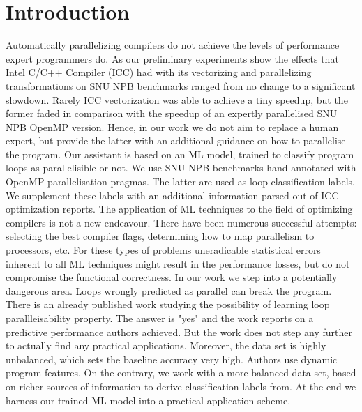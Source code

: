 \documentclass{acaces}
\begin{document}
\section{Introduction}
\quad Automatically parallelizing compilers do not achieve the levels of performance expert programmers do. As our preliminary experiments show the effects that Intel C/C++ Compiler (ICC) had with its vectorizing and parallelizing transformations on SNU NPB benchmarks ranged from no change to a significant slowdown. Rarely ICC vectorization was able to achieve a tiny speedup, but the former faded in comparison with the speedup of an expertly parallelised SNU NPB OpenMP version. Hence, in our work we do not aim to replace a human expert, but provide the latter with an additional guidance on how to parallelise the program.\newline\null
\quad Our assistant is based on an ML model, trained to classify program loops as parallelisible or not. We use SNU NPB benchmarks hand-annotated with OpenMP parallelisation pragmas. The latter are used as loop classification labels. We supplement these labels with an additional information parsed out of ICC optimization reports.\newline\null
\quad The application of ML techniques to the field of optimizing compilers is not a new endeavour. There have been numerous successful attempts: selecting the best compiler flags, determining how to map parallelism to processors, etc. For these types of problems uneradicable statistical errors inherent to all ML techniques might result in the performance losses, but do not compromise the functional correctness. In our work we step into a potentially dangerous area. Loops wrongly predicted as parallel can break the program. There is an already published work \cite{fried_ea:2013:icmla} studying the possibility of learning loop parallleisability property. The answer is "yes" and the work reports on a predictive performance authors achieved. But the work does not step any further to actually find any practical applications. Moreover, the data set is highly unbalanced, which sets the baseline accuracy very high. Authors use dynamic program features.\newline\null
\quad On the contrary, we work with a more balanced data set, based on richer sources of information to derive classification labels from. At the end we harness our trained ML model into a practical application scheme.
\end{document}
